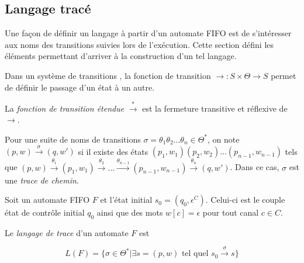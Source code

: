 

\subsection{Langage tracé}

Une façon de définir un langage à partir d'un automate FIFO est de s'intéresser aux noms des transitions suivies lors de l'exécution. Cette section défini les éléments permettant d'arriver à la construction d'un tel langage.

Dans un système de transitions \tsys, la fonction de transition $\rightarrow:S\times\Theta\rightarrow S$ permet de définir le passage d'un état à un autre.

La \emph{fonction de transition étendue} $\xrightarrow{*}$ est la fermeture transitive et réflexive de $\rightarrow$.

Pour une suite de noms de transitions $\sigma=\theta_1\theta_2 ...\theta_n\in\Theta^*$, on note $(p,w)\xrightarrow{\sigma}(q,w')$ si il existe des états $(p_1,w_1)(p_2,w_2)...(p_{n-1},w_{n-1})$ tels que $(p,w)\xrightarrow{\theta_1}(p_1,w_1)\xrightarrow{\theta_2}...\xrightarrow{\theta_{n-1}}(p_{n-1},w_{n-1})\xrightarrow{\theta_n}(q,w')$. Dans ce cas, $\sigma$ est une \emph{trace de chemin}.

\begin{definition} Soit un automate FIFO $F$ et l'état initial $s_0=(q_0, \epsilon^C)$. Celui-ci est le couple état de contrôle initial $q_0$ ainsi que des mots $w[c]=\epsilon$ pour tout canal $c\in C$.

  Le \emph{langage de trace} d'un automate $F$ est

  $$
  L(F)=\{\sigma\in\Theta^*|\exists s=(p,w) \text{ tel quel } s_0\xrightarrow{\sigma}s\}
  $$
\end{definition}

